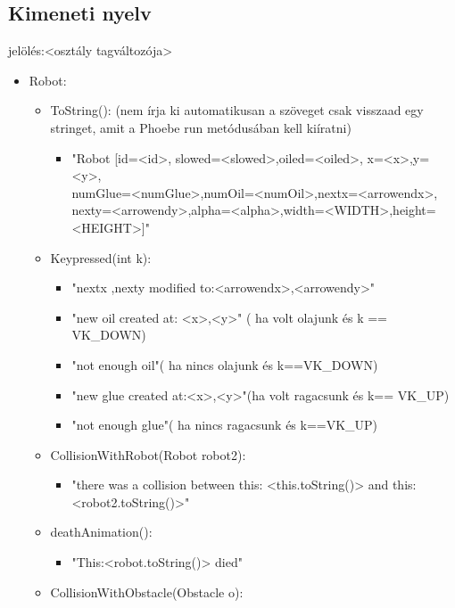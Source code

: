 \subsection{Kimeneti nyelv}

jelölés:<osztály tagváltozója>
\begin{itemize}
\item Robot: 
	\begin{itemize}
	\item ToString(): (nem írja ki automatikusan a szöveget csak visszaad egy stringet, amit a Phoebe run metódusában kell kiíratni)
	        \begin{itemize}
	\item "Robot [id=<id>,  slowed=<slowed>,oiled=<oiled>, x=<x>,y=<y>, \\numGlue=<numGlue>,numOil=<numOil>,nextx=<arrowendx>,\\nexty=<arrowendy>,alpha=<alpha>,width=<WIDTH>,height=<HEIGHT>]" 
	        \end{itemize}
	\item Keypressed(int k):
	       \begin{itemize}
	        \item "nextx ,nexty modified to:<arrowendx>,<arrowendy>"
            \item "new oil created at: <x>,<y>" ( ha volt olajunk és k == VK\_DOWN)
            \item "not enough oil"( ha nincs olajunk és k==VK\_DOWN)
            \item "new glue created at:<x>,<y>"(ha volt ragacsunk és k== VK\_UP)
            \item "not enough glue"( ha nincs ragacsunk és k==VK\_UP)
        
	       \end{itemize}
	 \item CollisionWithRobot(Robot robot2):
	       	
	        \begin{itemize}
	        \item  "there was a collision between this: <this.toString()> and this: <robot2.toString()>"
	        
	        \end{itemize}
    \item deathAnimation():
	        \begin{itemize}
	        \item  "This:<robot.toString()> died"
	        
	        \end{itemize}
	 \item CollisionWithObstacle(Obstacle o):
	       	

\end{itemize}
\end{itemize}
